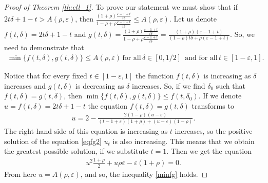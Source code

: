 \documentclass[11pt,a4paper]{amsart}
\newcommand{\eps}{\varepsilon}
\numberwithin{equation}{section}
\theoremstyle{plain}
\theoremstyle{definition}
\renewcommand{\leq}{\leqslant}
\renewcommand{\le}{\leqslant}
\begin{document}
\begin{proof}[Proof of Theorem \ref{th:ell_1}]
To prove our statement we must show that if  $2t\delta+1-t > A(\rho, \eps)$, then  $\frac{(1+\rho)\frac{\eps-1+t}{t\delta}}{1-\rho+\rho\frac{\eps-1+t}{t\delta}} \le A(\rho, \eps)$.  Let us denote $f(t, \delta)=2t\delta+1-t$ and $g(t, \delta)=\frac{(1+\rho)\frac{\eps-1+t}{t\delta}}{1-\rho+\rho\frac{\eps-1+t}{t\delta}}=\frac{(1+\rho)(\eps-1+t)}{(1-\rho)t\delta+\rho(\eps-1+t)}$. So, we need to demonstrate that 
\begin{align}\label{minfg}
\min\{f(t, \delta), g(t, \delta)\}\leq A(\rho, \eps)\, \text{for all}\, \delta\in[0, 1/2]\, \text{ and for all}\, t\in [1-\eps, 1].
\end{align}

Notice that for every fixed $t\in [1-\eps, 1]$  the function $f(t, \delta)$ is increasing as $\delta$ increases  and $g(t, \delta)$ is decreasing as $\delta$ increases. 
So, if we find $\delta_0$ such that $f(t, \delta)=g(t, \delta)$, then $\min\{f(t, \delta), g(t, \delta)\}\leq f(t, \delta_0)$.
If we denote  $u= f(t, \delta)= 2t\delta+1-t$ the equation  $f(t, \delta)=g(t, \delta)$  transforms to
\begin{align}\label{eqfg2}
u=2-\frac{2(1-\rho)(u-\eps)}{(t-1+\eps)(1+\rho)+(u-\eps)(1-\rho)}.
\end{align}
The right-hand side of this equation is increasing as $t$ increases, so the positive solution of the equation \eqref{eqfg2} $u_t$  is also increasing. This means that we obtain the greatest possible solution, if we substitute $t=1$. Then we get the equation
\begin{align*}
u^2\frac{1+\rho}{2}+u \rho\eps-\eps(1+\rho)=0.
\end{align*}
From here $u=A(\rho, \eps)$, and so, the inequality \eqref{minfg} holds.

%
%
%
\end{proof}
\end{document}
